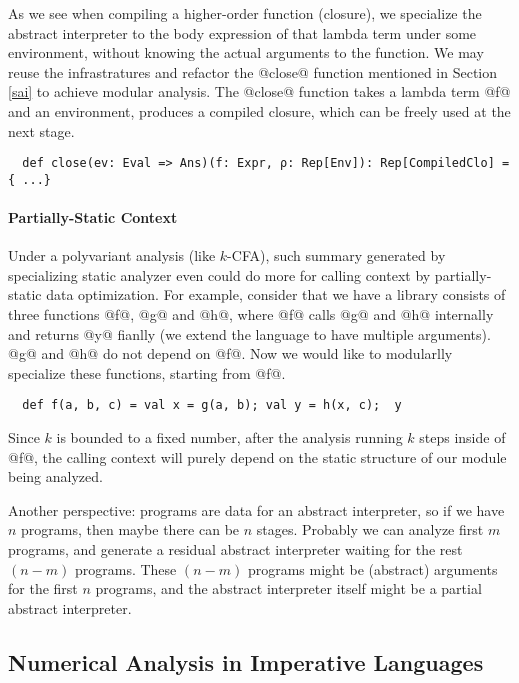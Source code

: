 As we see when compiling a higher-order function (closure), we specialize the
abstract interpreter to the body expression of that lambda term under some
environment, without knowing the actual arguments to the function. We may reuse
the infrastratures and refactor the @close@ function mentioned in Section
\ref{sai} to achieve modular analysis. The @close@ function takes a lambda term
@f@ and an environment, produces a compiled closure, which can be freely used at
the next stage.

\begin{lstlisting}
  def close(ev: Eval => Ans)(f: Expr, ρ: Rep[Env]): Rep[CompiledClo] = { ...}
\end{lstlisting}

\paragraph{Partially-Static Context} Under a polyvariant analysis (like
$k$-CFA), such summary generated by specializing static analyzer even could do
more for calling context by partially-static data optimization. For example,
consider that we have a library consists of three functions @f@, @g@ and @h@,
where @f@ calls @g@ and @h@ internally and returns @y@ fianlly (we extend the
language to have multiple arguments). @g@ and @h@ do not depend on @f@. Now we
would like to modularlly specialize these functions, starting from @f@.

\begin{lstlisting}
  def f(a, b, c) = val x = g(a, b); val y = h(x, c);  y
\end{lstlisting}

Since $k$ is bounded to a fixed number, after the analysis running $k$ steps
inside of @f@, the calling context will purely depend on the static structure of
our module being analyzed.

\iffalse
Another perspective: programs are data for an abstract interpreter, so if we
have $n$ programs, then maybe there can be $n$ stages. Probably we can analyze
first $m$ programs, and generate a residual abstract interpreter waiting for the
rest $(n-m)$ programs. These $(n-m)$ programs might be (abstract) arguments for
the first $n$ programs, and the abstract interpreter itself might be a partial
abstract interpreter.

\subsection{Numerical Analysis in Imperative Languages} \label{cases_imp}


